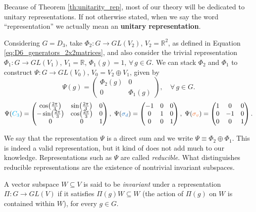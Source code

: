 Because of Theorem \ref{th:unitarity_rep}, most of our theory will be dedicated to unitary representations. If not otherwise stated, when we say the word ``representation'' we actually mean an \textbf{unitary representation}.

Considering $G = D_3$, take $\Phi_2: G \to GL(V_2)$, $V_2 = \mathbb{R}^2$, as defined in Equation \ref{eq:D6_generators_2x2matrices}, and also consider the trivial representation $\Phi_1: G \to GL(V_1)$, $V_1 = \mathbb{R}$, $\Phi_1(g) = 1$, $\forall \, g \in G$. We can stack $\Phi_2$ and $\Phi_1$ to construct $\Psi: G \to GL(V_0)$, $V_0 = V_2 \oplus V_1$, given by
$$
\Psi(g) =
\begin{pmatrix}
\Phi_2(g) & 0 \\
0 & \Phi_1(g)
\end{pmatrix}, \quad \forall \, g \in G.
$$
\begin{equation} \label{eq:D6_generators_3x3matrices}
\Psi(\Ct) =
\begin{pmatrix}
\cos(\frac{2\pi}{3}) & \sin(\frac{2\pi}{3}) & 0 \\
-\sin(\frac{2\pi}{3}) & \cos(\frac{2\pi}{3}) & 0 \\
0 & 0 & 1
\end{pmatrix},
\;
\Psi(\sd) =
\begin{pmatrix}
-1 & 0 & 0 \\
0 & 1 & 0 \\
0 & 0 & 1
\end{pmatrix},
\;
\Psi(\sv) =
\begin{pmatrix}
1 & 0 & 0 \\
0 & -1 & 0 \\
0 & 0 & 1
\end{pmatrix}.
\end{equation}

We say that the representation $\Psi$ is a direct sum and we write $\Psi \equiv \Phi_2 \oplus \Phi_1$. This is indeed a valid representation, but it kind of does not add much to our knowledge. Representations such as $\Psi$ are called \textit{reducible}. What distinguishes reducible representations are the existence of nontrivial invariant subspaces.
\begin{definition}
A vector subspace $W \subseteq V$ is said to be \textit{invariant} under a representation $\Pi: G \to GL(V)$ if it satisfies $\Pi(g) W \subseteq W$ (the action of $\Pi(g)$ on $W$ is contained within $W$), for every $g \in G$.
\end{definition}

